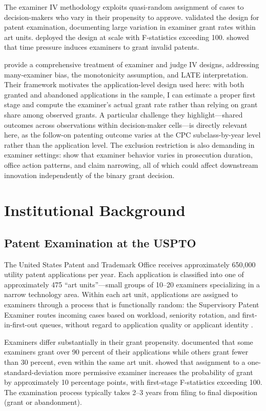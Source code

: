 \documentclass[12pt]{article}
\begin{document}
The examiner IV methodology exploits quasi-random assignment of cases to decision-makers who vary in their propensity to approve. \citet{lemley2012} validated the design for patent examination, documenting large variation in examiner grant rates within art units. \citet{farremensa2020} deployed the design at scale with F-statistics exceeding 100. \citet{frakes2017} showed that time pressure induces examiners to grant invalid patents.

\citet{chyn2024} provide a comprehensive treatment of examiner and judge IV designs, addressing many-examiner bias, the monotonicity assumption, and LATE interpretation. Their framework motivates the application-level design used here: with both granted and abandoned applications in the sample, I can estimate a proper first stage and compute the examiner's actual grant rate rather than relying on grant share among observed grants. A particular challenge they highlight---shared outcomes across observations within decision-maker cells---is directly relevant here, as the follow-on patenting outcome varies at the CPC subclass-by-year level rather than the application level. The exclusion restriction is also demanding in examiner settings: \citet{frakes2017} show that examiner behavior varies in prosecution duration, office action patterns, and claim narrowing, all of which could affect downstream innovation independently of the binary grant decision.


\section{Institutional Background}

\subsection{Patent Examination at the USPTO}

The United States Patent and Trademark Office receives approximately 650,000 utility patent applications per year. Each application is classified into one of approximately 475 ``art units''---small groups of 10--20 examiners specializing in a narrow technology area. Within each art unit, applications are assigned to examiners through a process that is functionally random: the Supervisory Patent Examiner routes incoming cases based on workload, seniority rotation, and first-in-first-out queues, without regard to application quality or applicant identity \citep{lemley2012, cockburn2003}.

Examiners differ substantially in their grant propensity. \citet{lemley2012} documented that some examiners grant over 90 percent of their applications while others grant fewer than 30 percent, even within the same art unit. \citet{farremensa2020} showed that assignment to a one-standard-deviation more permissive examiner increases the probability of grant by approximately 10 percentage points, with first-stage F-statistics exceeding 100. The examination process typically takes 2--3 years from filing to final disposition (grant or abandonment).
\end{document}
